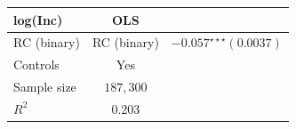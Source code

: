 \begin{table}[p]
\begin{center}
\begin{tabular}{lc}
\toprule
log(Inc) & OLS \\
\midrule
RC (binary) & RC (binary) &  \\
Controls & Yes \\
Sample size & $187,300$ \\
$R^{2}$ & $0.203$ \\
\bottomrule
\end{tabular}
\end{center}
\normalsize
\end{table}